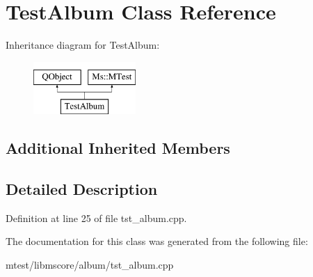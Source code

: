 \hypertarget{class_test_album}{}\section{Test\+Album Class Reference}
\label{class_test_album}
Inheritance diagram for Test\+Album\+:\begin{figure}[H]
\begin{center}
\leavevmode
\includegraphics[height=2.000000cm]{class_test_album}
\end{center}
\end{figure}
\subsection*{Additional Inherited Members}


\subsection{Detailed Description}


Definition at line 25 of file tst\+\_\+album.\+cpp.



The documentation for this class was generated from the following file\+:\begin{DoxyCompactItemize}
\item 
mtest/libmscore/album/tst\+\_\+album.\+cpp\end{DoxyCompactItemize}

